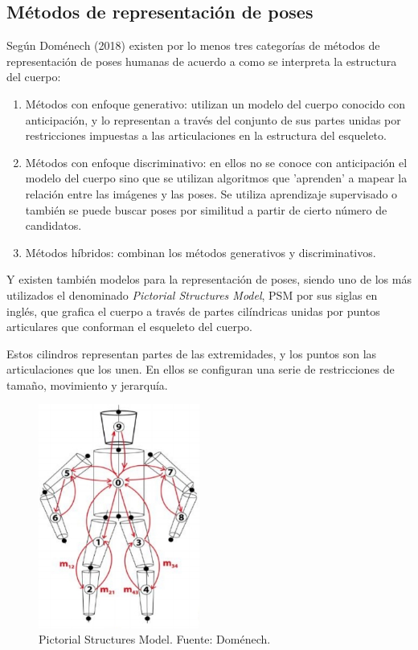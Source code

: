 \documentclass[a4paper,12pt,oneside,spanish]{book}
\begin{document}
\subsection{Métodos de representación de poses}
Según Doménech (2018) \cite{human1} existen por lo menos tres categorías de métodos de representación de poses humanas de acuerdo a como se interpreta la estructura del cuerpo:

\begin{enumerate}
	\baselineskip 16pt
	\item Métodos con enfoque generativo: utilizan un modelo del cuerpo conocido con anticipación, y lo representan a través del conjunto de sus partes unidas por restricciones impuestas a las articulaciones en la estructura del esqueleto.\par
	\item Métodos con enfoque discriminativo: en ellos no se conoce con anticipación el modelo del cuerpo sino que se utilizan algoritmos que 'aprenden' a mapear la relación entre las imágenes y las poses. Se utiliza aprendizaje supervisado o también se puede buscar poses por similitud a partir de cierto número de candidatos.\par
	\item Métodos híbridos: combinan los métodos generativos y discriminativos. \par
\end{enumerate}

Y existen también modelos para la representación de poses, siendo uno de los más utilizados el denominado \textit{Pictorial Structures Model}, PSM por sus siglas en inglés, que grafica el cuerpo a través de partes cilíndricas unidas por puntos articulares que conforman el esqueleto del cuerpo. \par
 
Estos cilindros representan partes de las extremidades, y los puntos son las articulaciones que los unen. En ellos se configuran una serie de restricciones de tamaño, movimiento y jerarquía.

\begin{figure}[h!]
	\includegraphics[width=150pt]{Imagenes/domenech1.jpg}
	\centering
	\caption{Pictorial Structures Model. Fuente: Doménech.}
	\label{fig:domenech2}
\end{figure}
\end{document}

